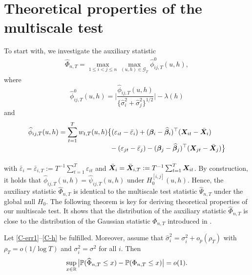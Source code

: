 \documentclass[12pt]{article}
\makeatletter
\renewcommand{\eqref}[1]{\tagform@{\ref{#1}}}
\makeatother
\begin{document}
\section{Theoretical properties of the multiscale test}\label{sec:theo}


To start with, we investigate the auxiliary statistic
\begin{align}\label{eq:Phi_hat}
\widehat{\Phi}_{n,T} = \max_{1 \le i < j \le n}  \max_{(u, h) \in \mathcal{G}_T} \widehat{\phi}^0_{ij, T}(u, h),
\end{align}
where
\begin{equation*}
\widehat{\phi}^0_{ij, T}(u, h) =\bigg| \frac{\widehat{\phi}_{ij, T}(u, h)} {\{ \widehat{\sigma}_i^2 + \widehat{\sigma}_j^2 \}^{1/2}} \bigg| - \lambda(h)
\end{equation*}
and
\begin{align*}
\widehat{\phi}_{ij, T}(u, h) 
 & = \sum_{t=1}^T w_{t,T}(u, h) \big\{ (\varepsilon_{it} - \bar{\varepsilon}_i) + (\bfbeta_i - \widehat{\bfbeta}_i)^\top (\X_{it} - \bar{\X}_{i}) \\[-0.4cm]
 & \phantom{= \sum_{t=1}^T w_{t,T}(u, h) \big\{} - (\varepsilon_{jt} - \bar{\varepsilon}_j) -  (\bfbeta_j - \widehat{\bfbeta}_j)^\top (\X_{jt} - \bar{\X}_{j}) \big\}
\end{align*}
with $\bar{\varepsilon}_i = \bar{\varepsilon}_{i,T} := T^{-1} \sum_{t=1}^T \varepsilon_{it}$ and $\bar{\boldsymbol{X}}_{i} =  \bar{\boldsymbol{X}}_{i, T} := T^{-1}\sum_{t=1}^T  \boldsymbol{X}_{it}$. By construction, it holds that $\widehat{\phi}_{ij, T}(u, h) = \widehat{\psi}_{ij, T}(u, h)$ under $H_0^{[i, j]}(u, h)$. Hence, the auxiliary statistic $\widehat{\Phi}_{n,T}$ is identical to the multiscale test statistic $\widehat{\Psi}_{n,T}$ under the global null $H_0$.
The following theorem is key for deriving theoretical properties of our multiscale test. It shows that the distribution of the auxiliary statistic $\widehat{\Phi}_{n,T}$ is close to the distribution of the Gaussian statistic $\Phi_{n,T}$ introduced in \eqref{eq:Phi}. 
\begin{theorem}\label{theo:stat:global}
Let \ref{C-err1}--\ref{C-h} be fulfilled. Moreover, assume that $\widehat{\sigma}_i^2 = \sigma_i^2 + o_p(\rho_T)$ with $\rho_T = o(1/\log T)$ and $\sigma_i^2 = \sigma^2$ for all $i$. Then  
\begin{equation*}
\sup_{x \in \mathbb{R}} \big| \mathbb{P}(\widehat{\Phi}_{n, T} \le x) - \mathbb{P}(\Phi_{n,T} \le x) \big| = o(1).
\end{equation*}
\end{theorem}
\end{document}
